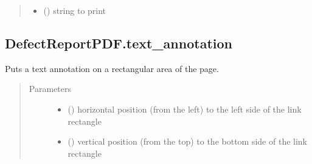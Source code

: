 \documentclass[letterpaper,10pt,english]{sphinxmanual}
\begin{document}
\begin{fulllineitems}
\begin{fulllineitems}
\begin{quote}
\begin{description}
\begin{itemize}
\item {} 
\sphinxAtStartPar
{} () \textendash{} string to print

\end{itemize}

\end{description}\end{quote}

\end{fulllineitems}



\subsection{DefectReportPDF.text\_annotation}
\label{\detokenize{generated/quality_assessment.quality_pdf_report.DefectReportPDF.text_annotation:defectreportpdf-text-annotation}}\label{\detokenize{generated/quality_assessment.quality_pdf_report.DefectReportPDF.text_annotation::doc}}

\begin{fulllineitems}
\label{\detokenize{generated/quality_assessment.quality_pdf_report.DefectReportPDF.text_annotation:quality_assessment.quality_pdf_report.DefectReportPDF.text_annotation}}
\sphinxAtStartPar
Puts a text annotation on a rectangular area of the page.
\begin{quote}\begin{description}
\item[{Parameters}] \leavevmode\begin{itemize}
\item {} 
\sphinxAtStartPar
{} () \textendash{} horizontal position (from the left) to the left side of the link rectangle

\item {} 
\sphinxAtStartPar
{} () \textendash{} vertical position (from the top) to the bottom side of the link rectangle


\end{itemize}
\end{description}
\end{quote}
\end{fulllineitems}
\end{fulllineitems}
\end{document}
